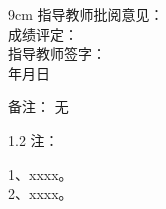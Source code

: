 \documentclass[12pt, a4paper]{article}
\begin{document}
\begin{labbox}{}{9cm}
    \hspace{1em}指导教师批阅意见：\\[3.5cm]
    \hspace{1em}成绩评定：\\[2cm]
    \hfill 指导教师签字：\hspace{4em} \\
    \hfill \makebox[3em]{}年\makebox[2em]{}月\makebox[2em]{}日\hspace{2em} \\[0.5em]
\end{labbox}

\begin{labbox}{备注：}{}
    无
\end{labbox}

\begin{spacing}{1.2}
    \noindent 注：\begin{minipage}[t]{0.88\textwidth}
        1、xxxx。\\
        2、xxxx。
    \end{minipage}
\end{spacing}
\end{document}

